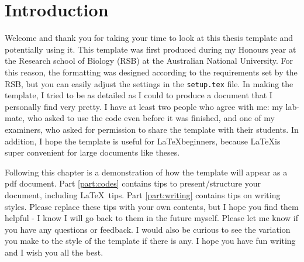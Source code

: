 \chapter{Introduction}
\label{intro}

Welcome and thank you for taking your time to look at this thesis template and potentially using it. This template was first produced during my Honours year at the Research school of Biology (RSB) at the Australian National University. For this reason, the formatting was designed according to the requirements set by the RSB, but you can easily adjust the settings in the \texttt{setup.tex} file. In making the template, I tried to be as detailed as I could to produce a document that I personally find very pretty. I have at least two people who agree with me: my lab-mate, who asked to use the code even before it was finished, and one of my examiners, who asked for permission to share the template with their students. In addition, I hope the template is useful for \LaTeX beginners, because \LaTeX is super convenient for large documents like theses.

Following this chapter is a demonstration of how the template will appear as a pdf document. Part \ref{part:codes} contains tips to present/structure your document, including \LaTeX\ tips. Part \ref{part:writing} contains tips on writing styles. Please replace these tips with your own contents, but I hope you find them helpful - I know I will go back to them in the future myself. Please let me know if you have any questions or feedback. I would also be curious to see the variation you make to the style of the template if there is any. I hope you have fun writing and I wish you all the best. 